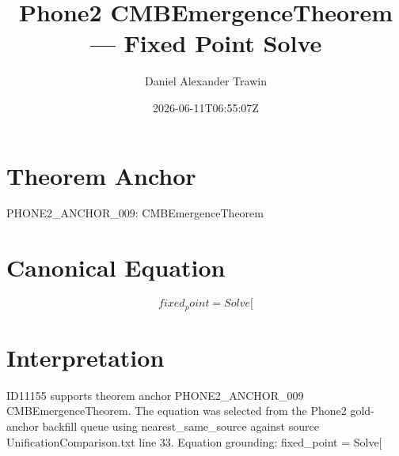 \documentclass[11pt]{article}
\title{Phone2 CMBEmergenceTheorem — Fixed Point Solve}
\author{Daniel Alexander Trawin}
\date{2026-06-11T06:55:07Z}
\begin{document}
\maketitle
\section*{Theorem Anchor}
PHONE2_ANCHOR_009: CMBEmergenceTheorem
\section*{Canonical Equation}
\[
fixed_point = Solve[
\]
\section*{Interpretation}
ID11155 supports theorem anchor PHONE2_ANCHOR_009 CMBEmergenceTheorem. The equation was selected from the Phone2 gold-anchor backfill queue using nearest_same_source against source UnificationComparison.txt line 33. Equation grounding: fixed_point = Solve[
\end{document}
